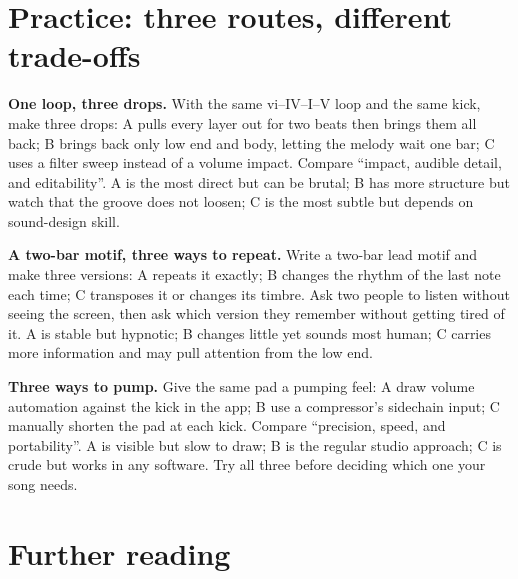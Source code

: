 \section{Practice: three routes, different trade-offs}
\label{sec:edm-practice}

\begin{exercise}
\textbf{One loop, three drops.} With the same vi--IV--I--V loop and the same kick, make three drops: A pulls every layer out for two beats then brings them all back; B brings back only low end and body, letting the melody wait one bar; C uses a filter sweep instead of a volume impact. Compare ``impact, audible detail, and editability''. A is the most direct but can be brutal; B has more structure but watch that the groove does not loosen; C is the most subtle but depends on sound-design skill.
\end{exercise}

\begin{exercise}
\textbf{A two-bar motif, three ways to repeat.} Write a two-bar lead motif and make three versions: A repeats it exactly; B changes the rhythm of the last note each time; C transposes it or changes its timbre. Ask two people to listen without seeing the screen, then ask which version they remember without getting tired of it. A is stable but hypnotic; B changes little yet sounds most human; C carries more information and may pull attention from the low end.
\end{exercise}

\begin{exercise}
\textbf{Three ways to pump.} Give the same pad a pumping feel: A draw volume automation against the kick in the app; B use a compressor's sidechain input; C manually shorten the pad at each kick. Compare ``precision, speed, and portability''. A is visible but slow to draw; B is the regular studio approach; C is crude but works in any software. Try all three before deciding which one your song needs.
\end{exercise}

\section{Further reading}
\label{sec:edm-reading}

